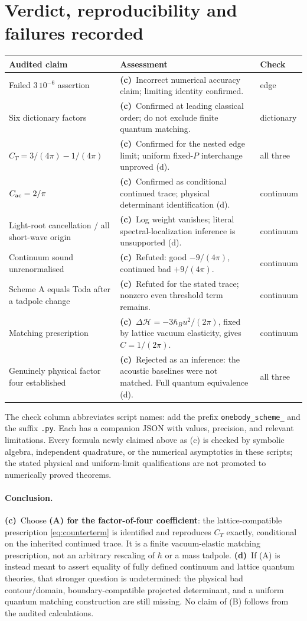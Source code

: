 \documentclass[11pt,a4paper]{article}
\newcommand{\Lc}{\textbf{(c)}\ }
\newcommand{\Ld}{\textbf{(d)}\ }
\begin{document}
\section{Verdict, reproducibility and failures recorded}
\begin{longtable}{@{}p{.37\linewidth}p{.43\linewidth}p{.13\linewidth}@{}}
\toprule Audited claim & Assessment & Check\\\midrule\endhead
Failed $3\,10^{-6}$ assertion & \Lc Incorrect numerical accuracy claim;
limiting identity confirmed. & edge\\
Six dictionary factors & \Lc Confirmed at leading classical order;
do not exclude finite quantum matching. & dictionary\\
$C_T=3/(4\pi)-1/(4\pi)$ & \Lc Confirmed for the nested edge limit;
uniform fixed-$P$ interchange unproved (d). & all three\\
$C_{\rm ac}=2/\pi$ & \Lc Confirmed as conditional continued trace;
physical determinant identification (d). & continuum\\
Light-root cancellation / all short-wave origin & \Lc Log weight vanishes;
literal spectral-localization inference is unsupported (d). & continuum\\
Continuum sound unrenormalised & \Lc Refuted: good $-9/(4\pi)$,
continued bad $+9/(4\pi)$. & continuum\\
Scheme A equals Toda after a tadpole change & \Lc Refuted for the stated
trace; nonzero even threshold term remains. & continuum\\
Matching prescription & \Lc $\Delta\mathcal H=-3\hbar_Bu^2/(2\pi)$,
fixed by lattice vacuum elasticity, gives $C=1/(2\pi)$. & continuum\\
Genuinely physical factor four established & \Lc Rejected as an inference:
the acoustic baselines were not matched. Full quantum equivalence (d). & all three\\
\bottomrule
\end{longtable}
The check column abbreviates script names: add the prefix
\texttt{onebody\_scheme\_} and the suffix \texttt{.py}.
Each has a companion JSON with values, precision, and relevant limitations.
Every formula newly claimed above
as (c) is checked by symbolic algebra, independent quadrature, or the
numerical asymptotics in these scripts; the stated physical and uniform-limit
qualifications are not promoted to numerically proved theorems.

\paragraph{Conclusion.}
\Lc Choose \textbf{(A) for the factor-of-four coefficient}: the
lattice-compatible prescription \eqref{eq:counterterm} is identified and
reproduces $C_T$ exactly, conditional on the inherited continued trace.
It is a finite vacuum-elastic matching prescription, not an arbitrary
rescaling of $\hbar$ or a mass tadpole. \Ld If (A) is instead meant to
assert equality of fully defined continuum and lattice quantum theories,
that stronger question is undetermined: the physical bad contour/domain,
boundary-compatible projected determinant, and a uniform quantum matching
construction are still missing. No claim of (B) follows from the audited
calculations.
\end{document}
